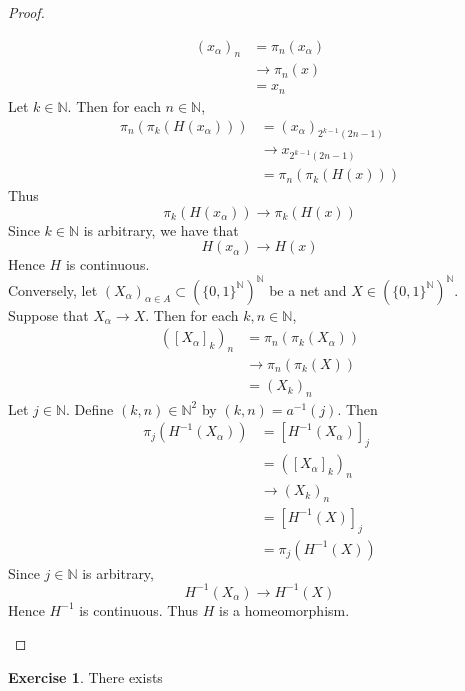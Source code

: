 \documentclass{book}
\theoremstyle{definition}
\newtheorem{ex}[definition]{Exercise}
\newcommand{\al}{\alpha}
\newcommand{\N}{\mathbb{N}}
\DeclareMathOperator*{\0}{\mbf{0}}
\DeclareMathOperator*{\1}{\mbf{1}}
\begin{document}
\begin{proof}
\begin{enumerate}
			\begin{align*}
				(x_{\al})_n
				& = \pi_n(x_{\al}) \\
				& \rightarrow \pi_n(x) \\
				& = x_n 
			\end{align*}
			Let $k \in \N$. Then for each $n \in \N$,
			\begin{align*}
				\pi_{n}(\pi_k(H(x_{\al})))
				& = (x_{\al})_{ 2^{k-1}(2n -1)} \\
				& \rightarrow x_{2^{k-1}(2n -1)} \\
				& = \pi_n(\pi_k(H(x)))
			\end{align*}
			Thus 
			$$\pi_k(H(x_{\al})) \rightarrow \pi_k(H(x))$$
			Since $k \in \N$ is arbitrary, we have that 
			$$H(x_{\al}) \rightarrow H(x)$$
			Hence $H$ is continuous. \\
			Conversely, let $(X_{\al})_{\al \in A} \subset (\{0,1\}^{\N})^{\N}$ be a net and $X \in (\{0,1\}^{\N})^{\N}$. Suppose that $X_{\al} \rightarrow X$. Then for each $k, n \in \N$, 
			\begin{align*}
				([X_{\al}]_k)_n  
				& = \pi_n(\pi_k(X_{\al})) \\
				& \rightarrow \pi_n(\pi_k(X)) \\ 
				& = (X_k)_n
			\end{align*}
			Let $j \in \N$. Define $(k,n) \in \N^2$ by $(k,n) = a^{-1}(j)$. Then 
			\begin{align*}
				\pi_j(H^{-1}(X_{\al}))
				& = [H^{-1}(X_{\al})]_j \\
				& = ([X_{\al}]_k)_n \\
				& \rightarrow (X_k)_n \\
				& = [H^{-1}(X)]_j \\
				& = \pi_j(H^{-1}(X))
			\end{align*}
			Since $j \in \N$ is arbitrary, 
			$$H^{-1}(X_{\al}) \rightarrow H^{-1}(X)$$
			Hence $H^{-1}$ is continuous. Thus $H$ is a homeomorphism.
		\end{enumerate}
	\end{proof}
	
	
	\begin{ex}
		There exists 
	\end{ex}
	
	
	
	
	
	
	
	
	
	
	
	
	
	
	
\end{document}
